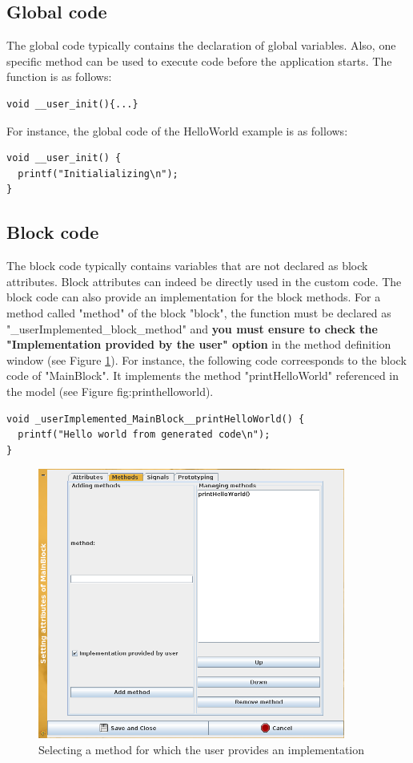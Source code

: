 \documentclass[12pt]{article}
\begin{document}
\subsection{Global code}
The global code typically contains the declaration of global variables. Also, one specific method can be used to execute code before the application starts. The function is as follows: 
\begin{verbatim}
void __user_init(){...}
\end{verbatim}
For instance, the global code of the HelloWorld example is as follows:
\begin{lstlisting}
void __user_init() {
  printf("Initialializing\n");
}
\end{lstlisting}

\subsection{Block code}
The block code typically contains variables that are not declared as block attributes. Block attributes can indeed be directly used in the custom code. The block code can also provide an implementation for the block methods. For a method called "method" of the block "block", the function must be declared as "\_userImplemented\_block\_method" and \textbf{you must ensure to check the "Implementation provided by the user" option} in the method definition window (see Figure \ref{fig:methodhelloworld}). For instance, the following code correesponds to the block code of "MainBlock". It implements the method "printHelloWorld" referenced in the model (see Figure {fig:printhelloworld}).
\begin{lstlisting}
void _userImplemented_MainBlock__printHelloWorld() {
  printf("Hello world from generated code\n");
}
\end{lstlisting}

\begin{figure}[htbp]
\centering
\includegraphics[width=0.9\textwidth]{figures/methodhelloworld}
\caption{Selecting a method for which the user provides an implementation}\label{fig:methodhelloworld}
\end{figure}
\end{document}

